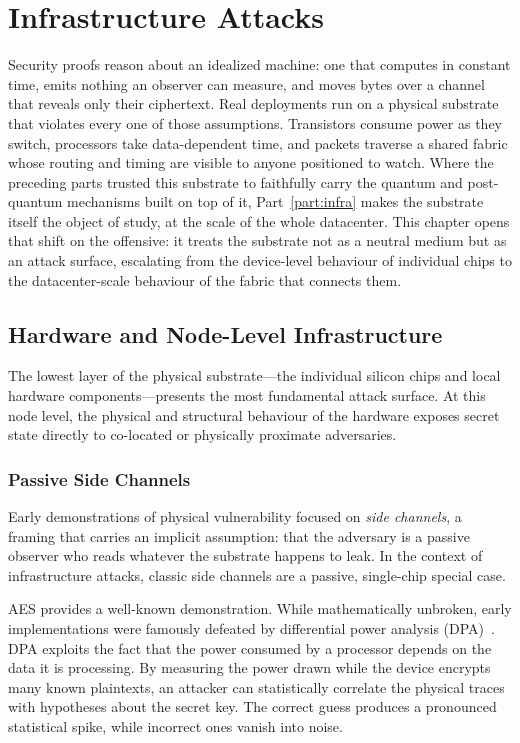 \chapter{Infrastructure Attacks}
\label{ch:rdma}

Security proofs reason about an idealized machine: one that computes in constant time, emits nothing an observer can measure, and moves bytes over a channel that reveals only their ciphertext. Real deployments run on a physical substrate that violates every one of those assumptions. Transistors consume power as they switch, processors take data-dependent time, and packets traverse a shared fabric whose routing and timing are visible to anyone positioned to watch. Where the preceding parts trusted this substrate to faithfully carry the quantum and post-quantum mechanisms built on top of it, Part~\ref{part:infra} makes the substrate itself the object of study, at the scale of the whole datacenter. This chapter opens that shift on the offensive: it treats the substrate not as a neutral medium but as an attack surface, escalating from the device-level behaviour of individual chips to the datacenter-scale behaviour of the fabric that connects them.

\section{Hardware and Node-Level Infrastructure}
\label{sec:node-infra}

The lowest layer of the physical substrate---the individual silicon chips and local hardware components---presents the most fundamental attack surface. At this node level, the physical and structural behaviour of the hardware exposes secret state directly to co-located or physically proximate adversaries.

\subsection{Passive Side Channels}
\label{sec:passive-side-channels}

Early demonstrations of physical vulnerability focused on \emph{side channels}, a framing that carries an implicit assumption: that the adversary is a passive observer who reads whatever the substrate happens to leak. In the context of infrastructure attacks, classic side channels are a passive, single-chip special case.

AES provides a well-known demonstration. While mathematically unbroken, early implementations were famously defeated by differential power analysis (DPA)~\cite{kocher1999differential}. DPA exploits the fact that the power consumed by a processor depends on the data it is processing. By measuring the power drawn while the device encrypts many known plaintexts, an attacker can statistically correlate the physical traces with hypotheses about the secret key. The correct guess produces a pronounced statistical spike, while incorrect ones vanish into noise.

